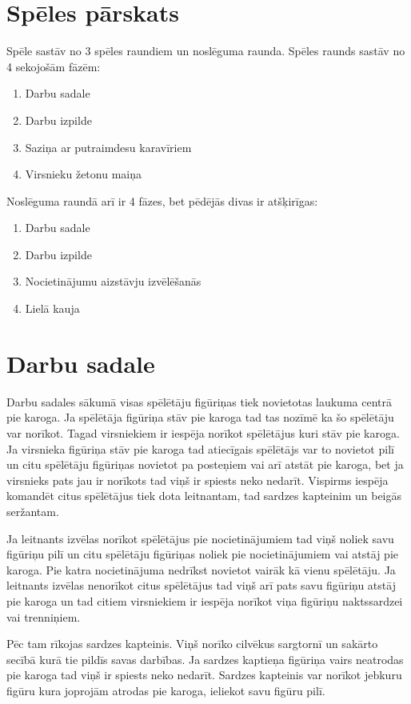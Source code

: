 \documentclass[11pt,a4paper,titlepage]{article}
\begin{document}
\section*{Spēles pārskats}
Spēle sastāv no 3 spēles raundiem un noslēguma raunda. Spēles raunds sastāv no 4 sekojošām fāzēm:
\begin{enumerate}
\item Darbu sadale
\item Darbu izpilde
\item Saziņa ar putraimdesu karavīriem
\item Virsnieku žetonu maiņa
\end{enumerate}
Noslēguma raundā arī ir 4 fāzes, bet pēdējās divas ir atšķirīgas:
\begin{enumerate}
\item Darbu sadale
\item Darbu izpilde
\item Nocietinājumu aizstāvju izvēlēšanās
\item Lielā kauja
\end{enumerate}

\section*{Darbu sadale}
Darbu sadales sākumā visas spēlētāju figūriņas tiek novietotas laukuma centrā pie karoga. Ja spēlētāja figūriņa stāv pie 
karoga tad tas nozīmē ka šo spēlētāju var norīkot. Tagad virsniekiem ir iespēja norīkot spēlētājus kuri stāv pie karoga. 
Ja virsnieka figūriņa stāv pie karoga tad atiecīgais spēlētājs var to novietot pilī un citu spēlētāju figūriņas novietot
pa posteņiem vai arī atstāt pie karoga, bet ja virsnieks pats jau ir norīkots tad viņš ir spiests neko nedarīt.
Vispirms iespēja komandēt citus spēlētājus tiek dota leitnantam, tad sardzes kapteinim un beigās seržantam. 

Ja leitnants izvēlas norīkot spēlētājus pie nocietinājumiem tad viņš noliek savu figūriņu pilī
un citu spēlētāju figūriņas noliek pie nocietinājumiem vai atstāj pie karoga. Pie katra nocietinājuma nedrīkst novietot
vairāk kā vienu spēlētāju. Ja leitnants izvēlas nenorīkot 
citus spēlētājus tad viņš arī pats savu figūriņu atstāj pie karoga un tad citiem virsniekiem ir iespēja norīkot viņa
figūriņu naktssardzei vai trenniņiem. 

Pēc tam rīkojas sardzes kapteinis. Viņš norīko cilvēkus sargtornī un sakārto secībā kurā tie pildīs savas darbības.
Ja sardzes kaptieņa figūriņa vairs neatrodas pie karoga tad viņš ir spiests neko nedarīt. Sardzes kapteinis var norīkot 
jebkuru figūru kura joprojām atrodas pie karoga, ieliekot savu figūru pilī.
\end{document}
